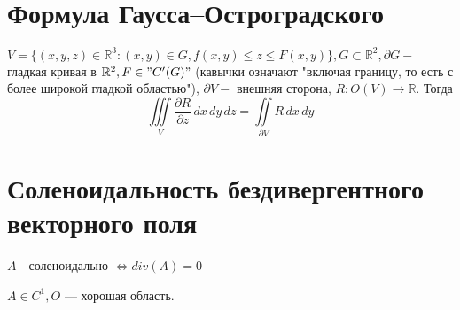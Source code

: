     \section{Формула Гаусса--Остроградского}
    $V = \{(x,y,z)\in \mathbb{R}^3: (x,y) \in G, f(x, y) \leq z \leq F(x,y)\}, G \subset \mathbb{R}^2, \partial G -$ гладкая кривая в $\mathbb{R}^2, F \in "C'(G)"$ (кавычки означают "включая границу, то есть с более широкой гладкой областью"), $\partial V - $ внешняя сторона, $R: O(V) \rightarrow \mathbb{R}$. Тогда
    $$\iiint\limits_{V}{\frac {\partial R}{\partial z} \,dx\,dy\,dz = \iint\limits_{\partial V}{R\,dx\,dy}}$$

    \section{Соленоидальность бездивергентного векторного поля}

    $A$ - соленоидально $ \Leftrightarrow div(A) = 0 $

    $A \in C^1, O $ --- хорошая область.
